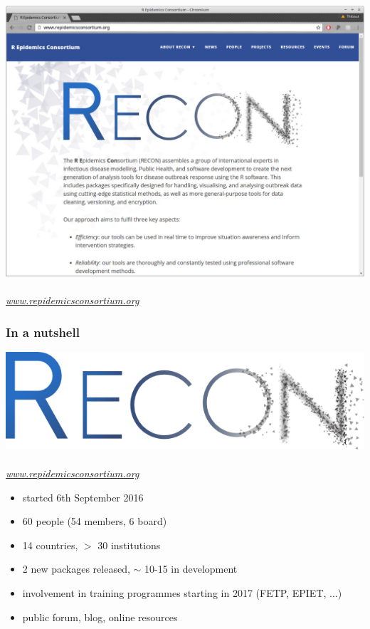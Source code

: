 \documentclass[xcolor=svgnames,mathserif]{beamer}
\begin{document}
\begin{frame}[fragile]
\begin{center} 
\includegraphics[width=.75 \textwidth]{figs/recon}
~\\
{\tiny \emph{\url{www.repidemicsconsortium.org}}}
\end{center}


\end{frame}






\begin{frame}[fragile]
  \frametitle{In a nutshell}

  \includegraphics[width=.5 \textwidth]{figs/recon-logo}
  ~\\
  \emph{\url{www.repidemicsconsortium.org}}

  \begin{itemize}
    
  \item started 6th September 2016 
    \vspace{.2cm}
  \item 60 people (54 members, 6 board)
    \vspace{.2cm}
  \item 14 countries, $>$ 30 institutions
    \vspace{.2cm}
  \item 2 new packages released, $\sim$ 10-15 in development
    \vspace{.2cm}
  \item involvement in training programmes starting in 2017 (FETP, EPIET, ...)
    \vspace{.2cm}
  \item \alert{public forum}, blog, online resources
  \end{itemize}

\end{frame}
\end{document}
